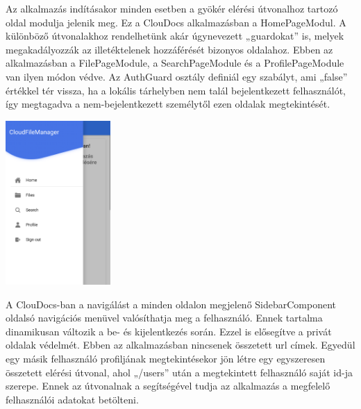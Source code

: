 \documentclass[12pt]{report}
\begin{document}
Az alkalmazás indításakor minden esetben a gyökér elérési útvonalhoz tartozó oldal modulja jelenik meg. Ez a ClouDocs alkalmazásban a HomePageModul. A különböző útvonalakhoz rendelhetünk akár úgynevezett „guardokat” is, melyek megakadályozzák az illetéktelenek hozzáférését bizonyos oldalahoz. Ebben az alkalmazásban a FilePageModule, a SearchPageModule és a ProfilePageModule van ilyen módon védve. Az AuthGuard osztály definiál egy szabályt, ami „false” értékkel tér vissza, ha a lokális tárhelyben nem talál bejelentkezett felhasználót, így megtagadva a nem-bejelentkezett személytől ezen oldalak megtekintését.

\begin{center}
	\includegraphics[width=40mm,scale=0.5,]{sidebar.png}
\end{center}


A ClouDocs-ban a navigálást a minden oldalon megjelenő SidebarComponent oldalsó navigációs menüvel valósíthatja meg a felhasználó. Ennek tartalma dinamikusan változik a be- és kijelentkezés során. Ezzel is elősegítve a privát oldalak védelmét. Ebben az alkalmazásban nincsenek összetett url címek. Egyedül egy másik felhasználó profiljának megtekintésekor jön létre egy egyszeresen összetett elérési útvonal, ahol „/users” után a megtekintett felhasználó saját id-ja szerepe. Ennek az útvonalnak a segítségével tudja az alkalmazás a megfelelő felhasználói adatokat betölteni.
\end{document}
